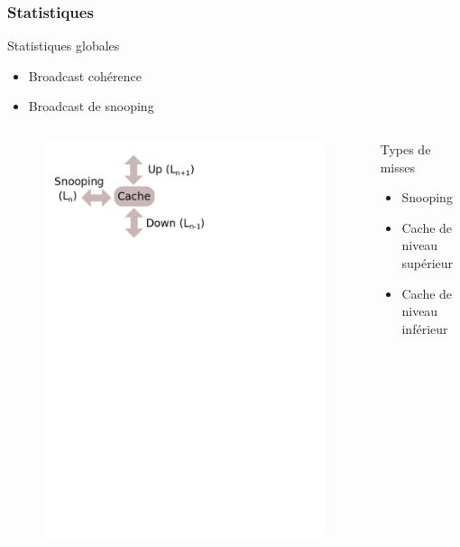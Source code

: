 \begin{frame}[fragile]
  \frametitle{Statistiques}
  
  \begin{block}{Statistiques globales}
    \begin{itemize}
    \item{Broadcast cohérence}
    \item{Broadcast de snooping}
    \end{itemize}
  \end{block}
  
  \begin{columns}[T]
    \begin{column}{.5\textwidth}
      \begin{figure}[h!]
	\includegraphics[scale=.4]{images/misses.png}
      \end{figure}
    \end{column}
    \begin{column}{.5\textwidth}
      \bigskip
      \begin{block}{Types de misses}
	\begin{itemize}
	\item{Snooping}
        \item{Cache de niveau supérieur}
        \item{Cache de niveau inférieur}
	\end{itemize}
      \end{block}
    \end{column}
  \end{columns}
\end{frame}
